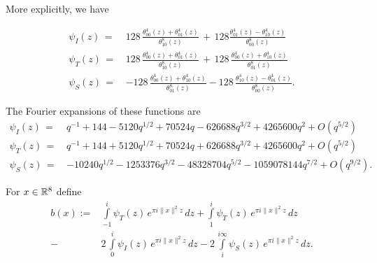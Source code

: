   More explicitly, we have
  \begin{lemma}\label{lemma: psi I psi T psi S explicit}
  \begin{align}
  \psi_I(z)\,=\,&128\,\frac{\theta_{00}^4(z)+\theta_{01}^4(z)}{\theta_{10}^8(z)}\,+\,128
                \frac{\theta_{01}^4(z)-\theta_{10}^4(z)}{\theta_{00}^8(z)}\label{eqn: psi I explicit}\\
  \psi_T(z)\,=\,&128\,\frac{\theta_{00}^4(z)+\theta_{01}^4(z)}{\theta_{10}^8(z)}\,+
                \,128\,\frac{\theta_{00}^4(z)+\theta_{10}^4(z)}{\theta_{01}^8(z)}\label{eqn: psi T explicit}\\
  \psi_S(z)\,=\,&-128\,\frac{\theta_{00}^4(z)+\theta_{10}^4(z)}{\theta_{01}^8(z)}-128\,
                \frac{\theta_{10}^4(z)-\theta_{01}^4(z)}{\theta_{00}^8(z)}.\label{eqn: psi S explicit}
  \end{align}
  \end{lemma}
  \begin{lemma}\label{lemma: psi fourier I psi fourier T psi fourier S}
  The Fourier expansions of these functions are
  \begin{align}
    \psi_I(z)\,=\,&q^{-1} + 144 - 5120 q^{1/2} + 70524 q - 626688 q^{3/2} + 4265600 q^2  + O(q^{5/2}) \label{eqn: psi fourier I}\\
    \psi_T(z)\,=\,&q^{-1} + 144 + 5120 q^{1/2} + 70524 q + 626688 q^{3/2} + 4265600 q^2  + O(q^{5/2}) \label{eqn: psi fourier T}\\
    \psi_S(z)\,=\,&-10240 q^{1/2} - 1253376 q^{3/2} - 48328704 q^{5/2} - 1059078144 q^{7/2}+O(q^{9/2}).\label{eqn: psi fourier S}
  \end{align}
  \end{lemma}
  \begin{definition}\label{def: b(r) definition}
  For $x\in\mathbb{R}^8$ define
  \begin{align}\label{eqn: b(r) definition}
    b(x):= & \int\limits_{-1}^{i}\psi_T(z)\,e^{\pi i \|x\|^2 z}\,dz
      + \int\limits_{1}^{i}\psi_T(z)\,e^{\pi i \|x\|^2 z}\,dz \\
    -& 2\,\int\limits_{0}^{i}\psi_I(z)\,e^{\pi i \|x\|^2 z}\,dz
    - 2\,\int\limits_{i}^{i\infty}\psi_S(z)\,e^{\pi i \|x\|^2 z}\,dz \nonumber.
  \end{align}
  \end{definition}
